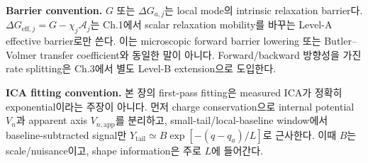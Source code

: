\documentclass[11pt,a4paper]{article}
\newcommand{\eff}{\mathrm{eff}}
\newcommand{\app}{\mathrm{app}}
\begin{document}
\textbf{Barrier convention.} $G$ 또는 $\Delta G_{a,j}$는 local mode의 intrinsic relaxation barrier다.
$\Delta G_{\eff,j}=G-\chi_j\mathcal A_j$는 Ch.1에서 scalar relaxation mobility를 바꾸는 Level-A effective barrier로만 쓴다.
이는 microscopic forward barrier lowering 또는 Butler--Volmer transfer coefficient와 동일한 말이 아니다. Forward/backward 방향성을
가진 rate splitting은 Ch.3에서 별도 Level-B extension으로 도입한다.

\textbf{ICA fitting convention.} 본 장의 first-pass fitting은 measured ICA가 정확히 exponential이라는 주장이 아니다.
먼저 charge conservation으로 internal potential $V_n$과 apparent axis $V_{n,\app}$를 분리하고, small-tail/local-baseline window에서
baseline-subtracted signal만 $Y_{\mathrm{tail}}\simeq B\exp[-(q-q_a)/L]$로 근사한다. 이때 $B$는 scale/nuisance이고, shape information은
주로 $L$에 들어간다.
\end{document}

